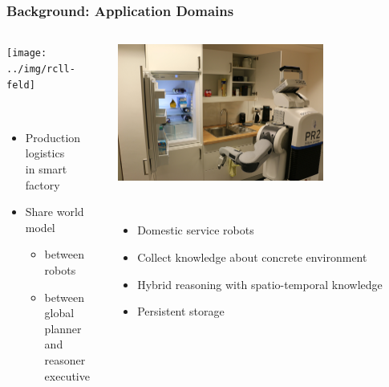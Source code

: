 \begin{frame}
  \frametitle{Background: Application Domains}
  \begin{columns}
    \begin{column}{0.5\textwidth}
    \begin{flushleft}
    \texttt{[image: ../img/rcll-feld]}
    \end{flushleft}
  \begin{description}[]
  \item[RoboCup Logistics League] \hfill \\
    \begin{itemize}
    \item Production logistics\\ in smart factory
    \item Share world model
    \begin{itemize}
    \item between robots
    \item between global planner and reasoner executive
    \end{itemize}
    \end{itemize}
  \end{description}
    \end{column}
    \begin{column}{0.5\textwidth}
    \begin{flushright}
    \includegraphics[width=0.7\textwidth]{../img/pr2-kbsg-kitchen}
    \end{flushright}
  \begin{description}[]
  \item[RoboCup@Home] \hfill \\
    \begin{itemize}
    \item Domestic service robots
    \item Collect knowledge about concrete environment
    \item Hybrid reasoning with spatio-temporal knowledge
    \item Persistent storage
    \end{itemize}
  \end{description}    
    \end{column}
  \end{columns}
  
\end{frame}


